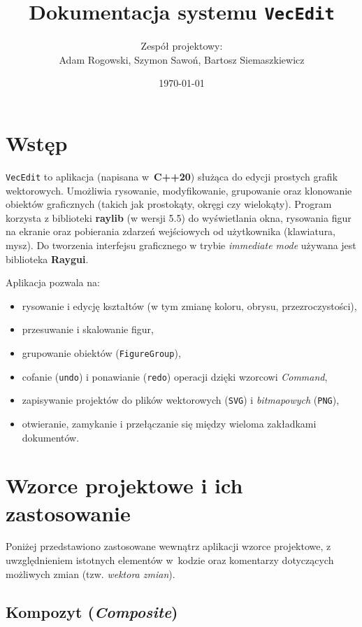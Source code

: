 \documentclass[a4paper,12pt]{article}
\title{\textbf{Dokumentacja systemu \texttt{VecEdit}}}
\author{Zespół projektowy: \\
\small Adam Rogowski, Szymon Sawoń, Bartosz Siemaszkiewicz}
\date{\today}
\begin{document}
\maketitle
\tableofcontents

\vfill

\section{Wstęp}

\texttt{VecEdit} to aplikacja (napisana w~\textbf{C++20}) służąca do edycji prostych
grafik wektorowych. Umożliwia rysowanie, modyfikowanie, grupowanie oraz klonowanie
obiektów graficznych (takich jak prostokąty, okręgi czy wielokąty). 
Program korzysta z biblioteki \textbf{raylib} (w wersji 5.5) do wyświetlania okna, 
rysowania figur na ekranie oraz pobierania zdarzeń wejściowych od użytkownika 
(klawiatura, mysz). Do tworzenia interfejsu graficznego w trybie \emph{immediate mode}
używana jest biblioteka \textbf{Raygui}.  

Aplikacja pozwala na:
\begin{itemize}
    \item rysowanie i edycję kształtów (w tym zmianę koloru, obrysu, przezroczystości),
    \item przesuwanie i skalowanie figur,
    \item grupowanie obiektów (\texttt{FigureGroup}),
    \item cofanie (\texttt{undo}) i ponawianie (\texttt{redo}) operacji dzięki wzorcowi \emph{Command},
    \item zapisywanie projektów do plików wektorowych (\texttt{SVG}) i \emph{bitmapowych} (\texttt{PNG}),
    \item otwieranie, zamykanie i przełączanie się między wieloma zakładkami dokumentów.
\end{itemize}

\pagebreak

\section{Wzorce projektowe i ich zastosowanie}

Poniżej przedstawiono zastosowane wewnątrz aplikacji wzorce projektowe,
z uwzględnieniem istotnych elementów w~kodzie oraz komentarzy dotyczących
możliwych zmian (tzw. \emph{wektora zmian}).

\subsection{Kompozyt (\emph{Composite})}
\end{document}
